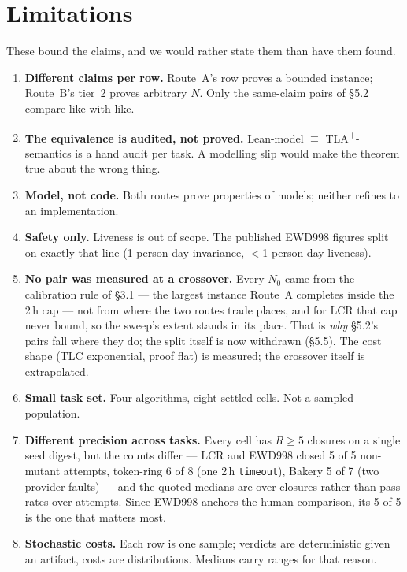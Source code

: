 \documentclass[11pt,a4paper]{article}
\begin{document}
\section{Limitations}

These bound the claims, and we would rather state them than have them found.

\begin{enumerate}
\item \textbf{Different claims per row.} Route~A's row proves a bounded instance; Route~B's tier~2
      proves arbitrary $N$. Only the same-claim pairs of \S5.2 compare like with like.
\item \textbf{The equivalence is audited, not proved.} Lean-model $\equiv$
      TLA\textsuperscript{+}-semantics is a hand audit per task. A modelling slip would make the
      theorem true about the wrong thing.
\item \textbf{Model, not code.} Both routes prove properties of models; neither refines to an
      implementation.
\item \textbf{Safety only.} Liveness is out of scope. The published EWD998 figures split on exactly
      that line (1 person-day invariance, $<$1 person-day liveness).
\item \textbf{No pair was measured at a crossover.} Every $N_0$ came from the calibration rule of \S3.1
      --- the largest instance Route~A completes inside the 2\,h cap --- not from where the two routes
      trade places, and for LCR that cap never bound, so the sweep's extent stands in its place. That
      is \emph{why} \S5.2's pairs fall where they do; the split itself is now withdrawn (\S5.5). The cost
      shape (TLC exponential, proof flat) is measured; the crossover itself is extrapolated.
\item \textbf{Small task set.} Four algorithms, eight settled cells. Not a sampled population.
\item \textbf{Different precision across tasks.} Every cell has $R \ge 5$ closures on a single seed
      digest, but the counts differ --- LCR and EWD998 closed 5 of 5 non-mutant attempts, token-ring
      6 of 8 (one 2\,h \texttt{timeout}), Bakery 5 of 7 (two provider faults) --- and the quoted
      medians are over closures rather than pass rates over attempts. Since EWD998 anchors the human
      comparison, its 5 of 5 is the one that matters most.
\item \textbf{Stochastic costs.} Each row is one sample; verdicts are deterministic given an artifact,
      costs are distributions. Medians carry ranges for that reason.

\end{enumerate}
\end{document}
